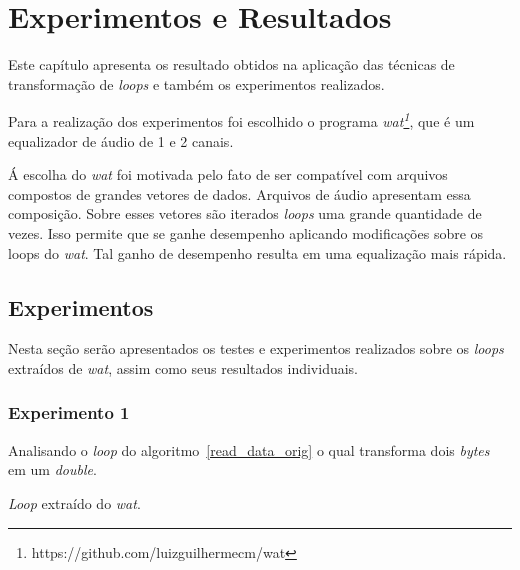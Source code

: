 \chapter{Experimentos e Resultados}

Este capítulo apresenta os resultado obtidos na aplicação das técnicas de
transformação de \textit{loops} e também
os experimentos realizados.

Para a realização dos experimentos foi escolhido o programa
\textit{wat\footnote{https://github.com/luizguilhermecm/wat}}, que é um
equalizador de áudio de 1 e 2 canais.


Á escolha do \textit{wat} foi motivada pelo fato de ser compatível com arquivos 
compostos de grandes vetores de dados. 
Arquivos de áudio apresentam essa composição. 
Sobre esses vetores são iterados \textit{loops} uma grande quantidade de vezes. 
Isso permite que se ganhe desempenho aplicando modificações sobre os loops do 
\textit{wat}. Tal ganho de desempenho resulta em uma equalização mais rápida.

\section{Experimentos}

Nesta seção serão apresentados os testes e experimentos realizados sobre os
\textit{loops} extraídos de \textit{wat}, assim como seus resultados
individuais. 

\subsection{Experimento 1}
Analisando o \textit{loop} do algoritmo~\ref{read_data_orig} o qual 
transforma dois \textit{bytes} em um \textit{double}.

\begin{algorithm}[H]
  \caption{\textit{Loop} extraído do \textit{wat}.}
    \label{read_data_orig}

\end{algorithm}


